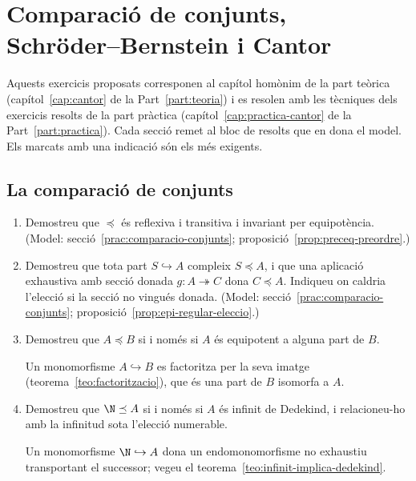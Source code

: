 \chapter[Schröder--Bernstein i Cantor]{Comparació de conjunts,\texorpdfstring{\\}{ }Schröder--Bernstein i Cantor}\label{cap:exercicis-cantor}

Aquests exercicis proposats corresponen al capítol homònim de la part teòrica (capítol~\ref{cap:cantor} de la Part~\ref{part:teoria}) i es resolen amb les tècniques dels exercicis resolts de la part pràctica (capítol~\ref{cap:practica-cantor} de la Part~\ref{part:practica}). Cada secció remet al bloc de resolts que en dona el model. Els marcats amb una indicació són els més exigents.

\section{La comparació de conjunts}

\begin{enumerate}
  \item Demostreu que \(\preceq\) és reflexiva i transitiva i invariant per equipotència. (Model: secció~\ref{prac:comparacio-conjunts}; proposició~\ref{prop:preceq-preordre}.)

  \item Demostreu que tota part \(S\hookrightarrow A\) compleix \(S\preceq A\), i que una aplicació exhaustiva amb secció donada \(g\colon A\twoheadrightarrow C\) dona \(C\preceq A\). Indiqueu on caldria l'elecció si la secció no vingués donada. (Model: secció~\ref{prac:comparacio-conjunts}; proposició~\ref{prop:epi-regular-eleccio}.)

  \item Demostreu que \(A\preceq B\) si i només si \(A\) és equipotent a alguna part de \(B\). \begin{indicacio}Un monomorfisme \(A\hookrightarrow B\) es factoritza per la seva imatge (teorema~\ref{teo:factoritzacio}), que és una part de \(B\) isomorfa a \(A\).\end{indicacio}

  \item Demostreu que \(\N\preceq A\) si i només si \(A\) és infinit de Dedekind, i relacioneu-ho amb la infinitud sota l'elecció numerable. \begin{indicacio}Un monomorfisme \(\N\hookrightarrow A\) dona un endomonomorfisme no exhaustiu transportant el successor; vegeu el teorema~\ref{teo:infinit-implica-dedekind}.\end{indicacio}
\end{enumerate}

